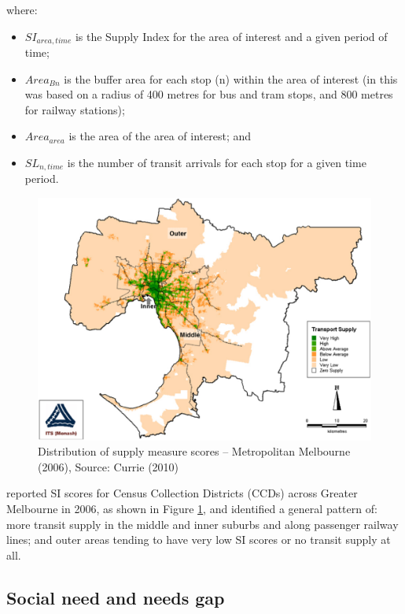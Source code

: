 \documentclass[preprint, 3p,
authoryear]{elsarticle} %
\begin{document}
where:

\begin{itemize}
\item
  \(SI_{area, time}\) is the Supply Index for the area of interest and a
  given period of time;
\item
  \(Area_{Bn}\) is the buffer area for each stop (n) within the area of
  interest (in \citet{currie2010identifying} this was based on a radius
  of 400 metres for bus and tram stops, and 800 metres for railway
  stations);
\item
  \(Area_{area}\) is the area of the area of interest; and
\item
  \(SL_{n,time}\) is the number of transit arrivals for each stop for a
  given time period.
\end{itemize}

\begin{figure}
\includegraphics[width=1\linewidth]{graphics/Currie2010SI} \caption{Distribution of supply measure scores – Metropolitan Melbourne (2006), Source: Currie (2010)}\label{fig:Currie_map_SI}
\end{figure}

\citet{currie2010identifying} reported SI scores for Census Collection
Districts (CCDs) across Greater Melbourne in 2006, as shown in Figure
\ref{fig:Currie_map_SI}, and identified a general pattern of: more
transit supply in the middle and inner suburbs and along passenger
railway lines; and outer areas tending to have very low SI scores or no
transit supply at all.

\subsection{Social need and needs gap}\label{social-need-and-needs-gap}
\end{document}
